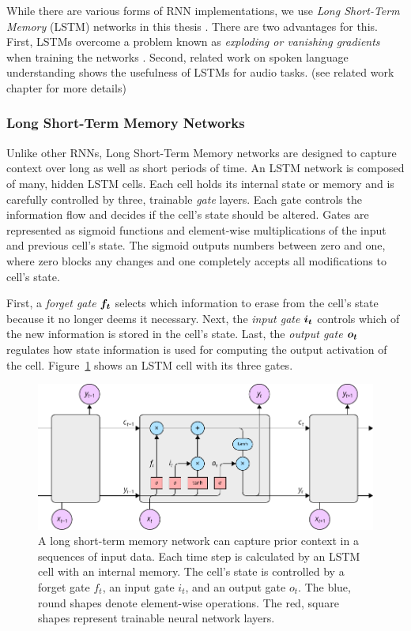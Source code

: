 	While there are various forms of RNN implementations, we use \emph{Long Short-Term Memory} (LSTM) networks in this thesis \cite{hochreiter1997long}. There are two advantages for this. First, LSTMs overcome a problem known as  \emph{exploding or vanishing gradients} when training the networks \cite[p.~288]{Goodfellow-et-al-2016}. Second, related work on spoken language understanding shows the usefulness of LSTMs for audio tasks. (see related work chapter for more details)

\subsubsection{Long Short-Term Memory Networks}
Unlike other RNNs, Long Short-Term Memory networks are designed to capture context over long as well as short periods of time. An LSTM network is composed of many, hidden LSTM cells. Each cell holds its internal state or memory and is carefully controlled by three, trainable \emph{gate} layers. Each gate controls the information flow and decides if the cell's state should be altered. Gates are represented as sigmoid functions and element-wise multiplications of the input and previous cell's state. The sigmoid outputs numbers between zero and one, where zero blocks any changes and one completely accepts all modifications to cell's state.

First, a \emph{forget gate} $\boldsymbol{f_t}$ selects which information to erase from the cell's state because it no longer deems it necessary. Next, the \emph{input gate} $\boldsymbol{i_t}$ controls which of the new information is stored in the cell's state. Last, the \emph{output gate} $\boldsymbol{o_t}$ regulates how state information is used for computing the output activation of the cell. Figure~\ref{fig:lstm} shows an LSTM cell with its three gates.
%
	\begin{figure}[tp]
  		\centering
    	\includegraphics{img/lstm.pdf}
    	\caption{A long short-term memory network can capture prior context in a sequences of input data. Each time step is calculated by an LSTM cell with an internal memory. The cell's state is controlled by a forget gate $f_t$, an input gate $i_t$, and an output gate $o_t$. The blue, round shapes denote element-wise operations. The red, square shapes represent trainable neural network layers.}
    	\label{fig:lstm}
	\end{figure}
%

